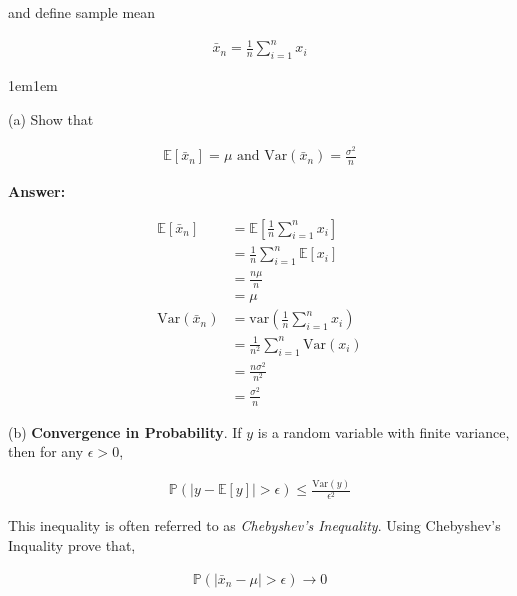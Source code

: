 \documentclass[11pt]{article}
\begin{document}
    and define sample mean 

    \begin{align*}
        \bar{x}_n = \frac{1}{n}\sum_{i = 1}^n x_i
    \end{align*}

    \begin{adjustwidth}{1em}{1em}
    
    (a) Show that 

    \begin{align*}
        \mathbb{E}[\bar{x}_n] = \mu \text{ and } \text{Var}(\bar{x}_n) = \frac{\sigma^2}{n} 
    \end{align*}

    \textbf{Answer:} 

    \begin{align*}
        \mathbb{E}[\bar{x}_n] &= \mathbb{E}\left[\frac{1}{n}\sum_{i=1}^n x_i\right] \\ 
                              &= \frac{1}{n}\sum_{i = 1}^n \mathbb{E}[x_i] \\ 
                              &= \frac{n\mu}{n} \\ 
                              &= \mu
                              \\ 
        \text{Var}(\bar{x}_n) &= \text{var}\left(\frac{1}{n}\sum_{i = 1}^n x_i\right) \\ 
                              &= \frac{1}{n^2} \sum_{i = 1}^n \text{Var}(x_i) \\ 
                              &= \frac{n\sigma^2}{n^2} \\ 
                              &= \frac{\sigma^2}{n}
    \end{align*}

    (b) \textbf{Convergence in Probability}. If $y$ is a random variable with finite variance,
    then for any $\epsilon > 0$, 

    \begin{align*}
        \mathbb{P}(|y - \mathbb{E}[y]| > \epsilon) \leq \frac{\text{Var}(y)}{\epsilon^2}
    \end{align*}

    This inequality is often referred to as \textit{Chebyshev's Inequality}. Using Chebyshev's 
    Inquality prove that, 

    \begin{align*}
        \mathbb{P}(|\bar{x}_n - \mu| > \epsilon) \to 0
    \end{align*}


\end{adjustwidth}
\end{document}
